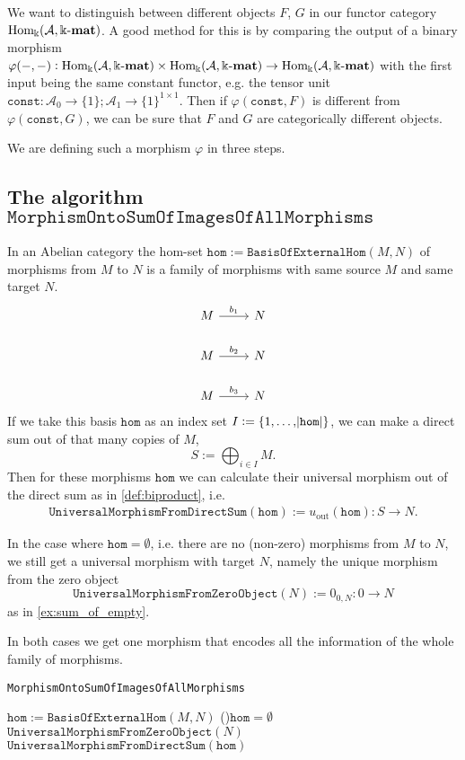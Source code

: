 
We want to distinguish between different objects $F$, $G$ in our functor category $\mathrm{Hom_{\Bbbk}}(\mathcal{A},\Bbbk\textnormal{-}\mathbf{mat})$. A good method for this is by comparing the output of a
binary morphism\\
$\varphi( -, - ) : \mathrm{Hom_{\Bbbk}}(\mathcal{A},\Bbbk\textnormal{-}\mathbf{mat}) \times \mathrm{Hom_{\Bbbk}}(\mathcal{A},\Bbbk\textnormal{-}\mathbf{mat}) \rightarrow \mathrm{Hom_{\Bbbk}}(\mathcal{A},\Bbbk\textnormal{-}\mathbf{mat})$ with the first input being the same constant functor,
e.g. the tensor unit $\mathtt{const} : \mathcal{A}_{0} \rightarrow \{1\}; \mathcal{A}_{1} \rightarrow \{1\}^{1\times 1}$.
Then if $\varphi( \mathtt{const}, F )$ is different from $\varphi( \mathtt{const}, G )$, we can be sure that $F$ and $G$ are categorically different objects.

We are defining such a morphism $\varphi$ in three steps.

\subsection{The algorithm $\mathtt{MorphismOntoSumOfImagesOfAllMorphisms}$}

In an Abelian category the hom-set $\mathtt{hom} := \mathtt{BasisOfExternalHom}( M, N )$ of morphisms from $M$ to $N$ is a family of
morphisms with same source $M$ and same target $N$.
\[
\begin{tikzcd}
M \arrow[r, "b_{1}"] & N \\
M \arrow[r, "b_{2}"] & N \\
M \arrow[r, "b_{3}"] & N
\end{tikzcd}
\]
If we take this basis $\mathtt{hom}$ as an index set $I := \{1,\dots,\abs{\mathtt{hom}}\}$, we can make a direct sum out of that many copies of $M$,
\[
S := \bigoplus_{i\in I} M.
\]
Then for these morphisms $\mathtt{hom}$ we can calculate their universal morphism out of the direct sum as in \ref{def:biproduct}, i.e.
\begin{align}
\mathtt{UniversalMorphismFromDirectSum}( \mathtt{hom} ) := u_{\text{out}}(\mathtt{hom}) : S \rightarrow N.
\end{align}

In the case where $\mathtt{hom} = \emptyset$, i.e. there are no (non-zero) morphisms from $M$ to $N$, we still get a
universal morphism with target $N$, namely the unique morphism from the zero object
\[
\mathtt{UniversalMorphismFromZeroObject}( N ) := 0_{0,N} : 0 \rightarrow N
\]
as in \ref{ex:sum_of_empty}.

In both cases we get one morphism that encodes all the information of the whole family of morphisms. 

\begin{algorithm}[H]\capstart
    \caption{\texttt{MorphismOntoSumOfImagesOfAllMorphisms}}\label{algo:MorphismOntoSumOfImagesOfAllMorphisms}
	\BlankLine
	$\mathtt{hom} := \mathtt{BasisOfExternalHom}( M, N )$\;
	\If(){$\mathtt{hom} = \emptyset$}{
	    \Return $\mathtt{UniversalMorphismFromZeroObject}( N )$\;
	}
	\BlankLine
	\Return $\mathtt{UniversalMorphismFromDirectSum}( \mathtt{hom} )$\;
\end{algorithm}

